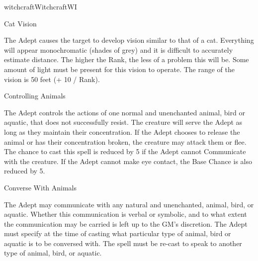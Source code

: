 \begin{college}[1.1]{witchcraft}{Witchcraft}{WI}
\begin{spell}[S-5]{Cat Vision}

\begin{effects}
The Adept causes the target to develop vision similar to that of a
cat.  Everything will appear monochromatic (\ie shades of grey) and
it is difficult to accurately estimate distance.  The higher the
Rank, the less of a problem this will be.  Some amount of light must
be present for this vision to operate.  The range of the vision is 50
feet (+ 10 / Rank).
\end{effects}
\end{spell}

\begin{spell}[S-6]{Controlling Animals}

\begin{effects}
The Adept controls the actions of one normal and unenchanted animal,
bird or aquatic, that does not successfully resist.  The creature will
serve the Adept as long as they maintain their concentration.  If the
Adept chooses to release the animal or has their concentration
broken, the creature may attack them or flee. The chance to cast this
spell is reduced by 5 if the Adept cannot Communicate with the
creature.  If the Adept cannot make eye contact, the Base Chance is
also reduced by 5.
\end{effects}
\end{spell}

\begin{spell}[S-7]{Converse With Animals}

\begin{effects}
The Adept may communicate with any natural and unenchanted, animal,
bird, or aquatic.  Whether this communication is verbal or symbolic,
and to what extent the communication may be carried is left up to the
GM's discretion.  The Adept must specify at the time of casting what
particular type of animal, bird or aquatic is to be conversed
with. The spell must be re-cast to speak to another type of animal,
bird, or aquatic.
\end{effects}
\end{spell}


\end{college}
